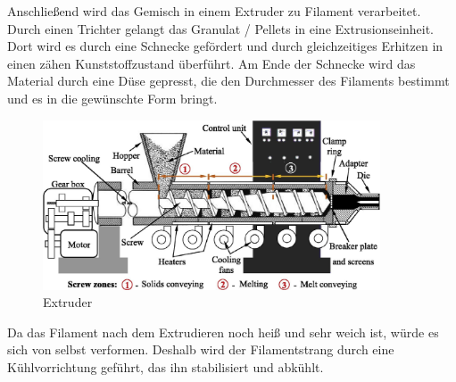 \documentclass[10pt]{article}
\begin{document}
    Anschließend wird das Gemisch in einem Extruder zu Filament verarbeitet.
    Durch einen Trichter gelangt das Granulat / Pellets in eine Extrusionseinheit.
    Dort wird es durch eine Schnecke gefördert und durch gleichzeitiges Erhitzen in einen zähen Kunststoffzustand überführt.
    Am Ende der Schnecke wird das Material durch eine Düse gepresst, die den Durchmesser des Filaments bestimmt und es in die gewünschte Form bringt.

    \begin{figure}[H]
        \centering
        \includegraphics[width=10cm]{img/Production}
        \caption*{Extruder}
    \end{figure}

    Da das Filament nach dem Extrudieren noch heiß und sehr weich ist, würde es sich von selbst verformen.
    Deshalb wird der Filamentstrang durch eine Kühlvorrichtung geführt, das ihn stabilisiert und abkühlt.


    \begin{figure}[H]
        \centering
        \qquad
    \end{figure}
\end{document}

